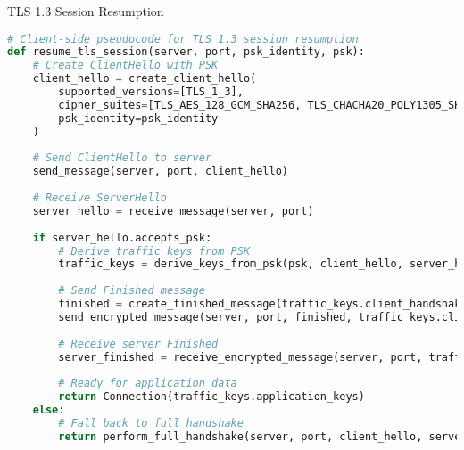 \begin{examplecode}{TLS 1.3 Session Resumption}\\
\begin{lstlisting}[language=Python, style=basesmol]
# Client-side pseudocode for TLS 1.3 session resumption
def resume_tls_session(server, port, psk_identity, psk):
    # Create ClientHello with PSK
    client_hello = create_client_hello(
        supported_versions=[TLS_1_3],
        cipher_suites=[TLS_AES_128_GCM_SHA256, TLS_CHACHA20_POLY1305_SHA256],
        psk_identity=psk_identity
    )
    
    # Send ClientHello to server
    send_message(server, port, client_hello)
    
    # Receive ServerHello
    server_hello = receive_message(server, port)
    
    if server_hello.accepts_psk:
        # Derive traffic keys from PSK
        traffic_keys = derive_keys_from_psk(psk, client_hello, server_hello)
        
        # Send Finished message
        finished = create_finished_message(traffic_keys.client_handshake_key)
        send_encrypted_message(server, port, finished, traffic_keys.client_handshake_key)
        
        # Receive server Finished
        server_finished = receive_encrypted_message(server, port, traffic_keys.server_handshake_key)
        
        # Ready for application data
        return Connection(traffic_keys.application_keys)
    else:
        # Fall back to full handshake
        return perform_full_handshake(server, port, client_hello, server_hello)
\end{lstlisting}
\end{examplecode}


